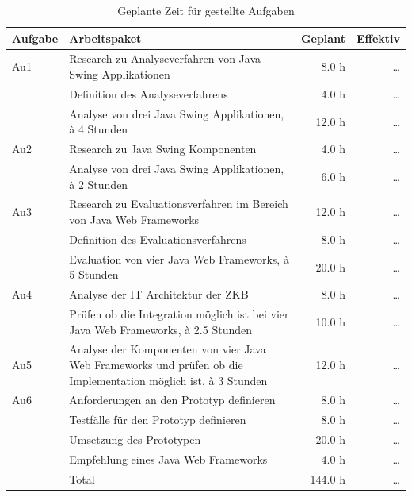   \begin{table}[p]
    \sffamily 
    \begin{center}
      \begin{tabular}{lp{7cm}rr}
        \toprule
        \textbf{Aufgabe} & \textbf{Arbeitspaket} & \textbf{Geplant} &
        \textbf{Effektiv}\\

        \midrule
        Au1 &
        Research zu Analyseverfahren von Java Swing Applikationen &
        8.0 h &
        \ldots\\
        &
        Definition des Analyseverfahrens &
        4.0 h &
        \ldots\\
        &
        Analyse von drei Java Swing Applikationen, à 4 Stunden &
        12.0 h &
        \ldots\\

        \midrule
        Au2 &
        Research zu Java Swing Komponenten &
        4.0 h &
        \ldots\\
        &
        Analyse von drei Java Swing Applikationen, à 2 Stunden &
        6.0 h &
        \ldots\\

        \midrule
        Au3 &
        Research zu Evaluationsverfahren im Bereich von Java Web Frameworks &
        12.0 h &
        \ldots\\
        &
        Definition des Evaluationsverfahrens &
        8.0 h &
        \ldots\\
        &
        Evaluation von vier Java Web Frameworks, à 5 Stunden &
        20.0 h &
        \ldots\\

        \midrule
        Au4 &
        Analyse der IT Architektur der ZKB &
        8.0 h &
        \ldots\\
        &
        Prüfen ob die Integration möglich ist bei vier Java Web Frameworks, à
        2.5 Stunden &
        10.0 h &
        \ldots\\
        
        \midrule
        Au5 &
        Analyse der Komponenten von vier Java Web Frameworks und prüfen ob die
        Implementation möglich ist, à 3 Stunden &
        12.0 h &
        \ldots\\
        
        \midrule
        Au6 &
        Anforderungen an den Prototyp definieren &
        8.0 h &
        \ldots\\
        &
        Testfälle für den Prototyp definieren &
        8.0 h &
        \ldots\\
        &
        Umsetzung des Prototypen &
        20.0 h &
        \ldots\\
        &
        Empfehlung eines Java Web Frameworks &
        4.0 h &
        \ldots\\
        \bottomrule
        &
        Total &
        144.0 h &
        \ldots\\
        \bottomrule
      \end{tabular}
      \caption{Geplante Zeit für gestellte Aufgaben}
      \label{tab:aufgabenPlaning}
    \end{center}
  \end{table}
  

